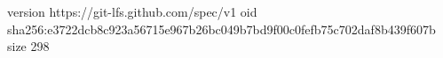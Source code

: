 version https://git-lfs.github.com/spec/v1
oid sha256:e3722dcb8c923a56715e967b26bc049b7bd9f00c0fefb75c702daf8b439f607b
size 298
